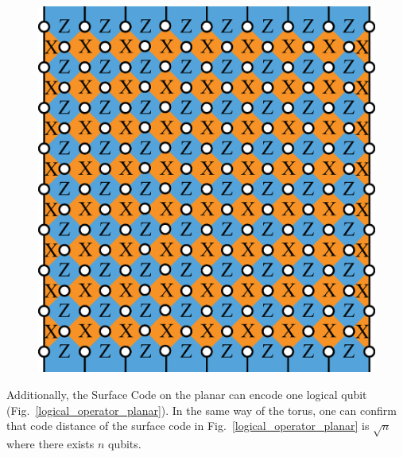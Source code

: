 \documentclass[a4paper,11pt]{ltjsarticle}
\begin{document}
{{        \begin{figure}[h]
            \centering
            \includegraphics[scale=0.40]{figure/planar.eps}
            \vspace{0pt}\caption{}
            \label{planar}
            \vspace{-10pt}
        \end{figure}

        Additionally, the Surface Code on the planar can encode one logical qubit (Fig.~\ref{logical_operator_planar}). In the same way of the torus, one can confirm that code distance of the surface code in Fig.~\ref{logical_operator_planar} is $\sqrt{n}$ where there exists $n$ qubits.

}}
\end{document}
